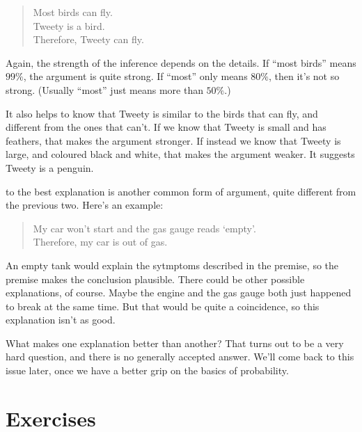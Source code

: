 \documentclass[justified]{tufte-book}
\newenvironment{argument}{\begin{quote}\normalsize}{\end{quote}}
\begin{document}
\begin{argument}
Most birds can fly.\\
Tweety is a bird.\\
Therefore, Tweety can fly.
\end{argument}

Again, the strength of the inference depends on the details. If ``most birds'' means \(99\%\), the argument is quite strong. If ``most'' only means \(80\%\), then it's not so strong. (Usually ``most'' just means more than \(50\%\).)

It also helps to know that Tweety is similar to the birds that can fly, and different from the ones that can't. If we know that Tweety is small and has feathers, that makes the argument stronger. If instead we know that Tweety is large, and coloured black and white, that makes the argument weaker. It suggests Tweety is a penguin.

 to the best explanation is another common form of argument, quite different from the previous two. Here's an example:

\begin{argument}
My car won't start and the gas gauge reads `empty'.\\
Therefore, my car is out of gas.
\end{argument}

An empty tank would explain the sytmptoms described in the premise, so the premise makes the conclusion plausible. There could be other possible explanations, of course. Maybe the engine and the gas gauge both just happened to break at the same time. But that would be quite a coincidence, so this explanation isn't as good.

What makes one explanation better than another? That turns out to be a very hard question, and there is no generally accepted answer. We'll come back to this issue later, once we have a better grip on the basics of probability.

\hypertarget{exercises-1}{%
\section*{Exercises}\label{exercises-1}}
\end{document}
